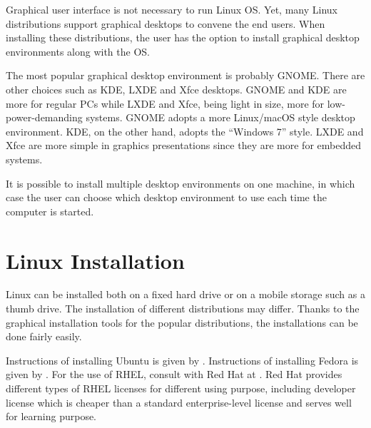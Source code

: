 Graphical user interface is not necessary to run Linux OS. Yet, many Linux distributions support graphical desktops to convene the end users. When installing these distributions, the user has the option to install graphical desktop environments along with the OS. 

The most popular graphical desktop environment is probably GNOME. There are other choices such as KDE, LXDE and Xfce desktops. GNOME and KDE are more for regular PCs while LXDE and Xfce, being light in size, more for low-power-demanding systems. GNOME adopts a more Linux/macOS style desktop environment. KDE, on the other hand, adopts the ``Windows 7'' style. LXDE and Xfce are more simple in graphics presentations since they are more for embedded systems.

It is possible to install multiple desktop environments on one machine, in which case the user can choose which desktop environment to use each time the computer is started.

\section{Linux Installation}

Linux can be installed both on a fixed hard drive or on a mobile storage such as a thumb drive. The installation of different distributions may differ. Thanks to the graphical installation tools for the popular distributions, the installations can be done fairly easily.

Instructions of installing Ubuntu is given by \cite{ubuntu2025ubuntu}. Instructions of installing Fedora is given by \cite{fedora2025fedora}. For the use of RHEL, consult with Red Hat at \cite{rhel2025rhel}. Red Hat provides different types of RHEL licenses for different using purpose, including developer license which is cheaper than a standard enterprise-level license and serves well for learning purpose.
